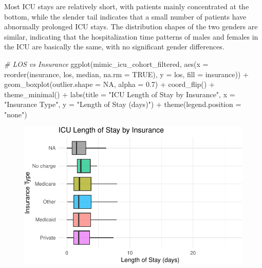 \documentclass[
]{article}
\newenvironment{Shaded}{\begin{snugshade}}{\end{snugshade}}
\newcommand{\AttributeTok}[1]{\textcolor[rgb]{0.77,0.63,0.00}{#1}}
\newcommand{\CommentTok}[1]{\textcolor[rgb]{0.56,0.35,0.01}{\textit{#1}}}
\newcommand{\ConstantTok}[1]{\textcolor[rgb]{0.00,0.00,0.00}{#1}}
\newcommand{\FloatTok}[1]{\textcolor[rgb]{0.00,0.00,0.81}{#1}}
\newcommand{\FunctionTok}[1]{\textcolor[rgb]{0.00,0.00,0.00}{#1}}
\newcommand{\NormalTok}[1]{\textcolor[rgb]{0.00,0.00,0.00}{#1}}
\newcommand{\SpecialCharTok}[1]{\textcolor[rgb]{0.00,0.00,0.00}{#1}}
\newcommand{\StringTok}[1]{\textcolor[rgb]{0.31,0.60,0.02}{#1}}
\begin{document}
Most ICU stays are relatively short, with patients mainly concentrated
at the bottom, while the slender tail indicates that a small number of
patients have abnormally prolonged ICU stays. The distribution shapes of
the two genders are similar, indicating that the hospitalization time
patterns of males and females in the ICU are basically the same, with no
significant gender differences.

\begin{Shaded}
\begin{Highlighting}[]
\CommentTok{\# LOS vs Insurance}
\FunctionTok{ggplot}\NormalTok{(mimic\_icu\_cohort\_filtered, }\FunctionTok{aes}\NormalTok{(}\AttributeTok{x =} \FunctionTok{reorder}\NormalTok{(insurance, }
\NormalTok{                                                  los, median, }\AttributeTok{na.rm =} \ConstantTok{TRUE}\NormalTok{), }
                                      \AttributeTok{y =}\NormalTok{ los, }\AttributeTok{fill =}\NormalTok{ insurance)) }\SpecialCharTok{+}
  \FunctionTok{geom\_boxplot}\NormalTok{(}\AttributeTok{outlier.shape =} \ConstantTok{NA}\NormalTok{, }\AttributeTok{alpha =} \FloatTok{0.7}\NormalTok{) }\SpecialCharTok{+}
  \FunctionTok{coord\_flip}\NormalTok{() }\SpecialCharTok{+}
  \FunctionTok{theme\_minimal}\NormalTok{() }\SpecialCharTok{+}
  \FunctionTok{labs}\NormalTok{(}\AttributeTok{title =} \StringTok{"ICU Length of Stay by Insurance"}\NormalTok{, }
       \AttributeTok{x =} \StringTok{"Insurance Type"}\NormalTok{, }\AttributeTok{y =} \StringTok{"Length of Stay (days)"}\NormalTok{) }\SpecialCharTok{+}
  \FunctionTok{theme}\NormalTok{(}\AttributeTok{legend.position =} \StringTok{"none"}\NormalTok{)}
\end{Highlighting}
\end{Shaded}

\begin{figure}[H]

{\centering \includegraphics{hw3_files/figure-pdf/8.3-1.pdf}

}

\end{figure}
\end{document}
